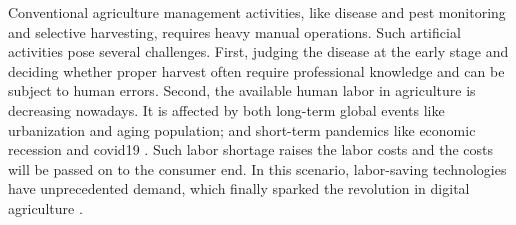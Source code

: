 Conventional agriculture management activities, like disease and pest monitoring and selective harvesting, requires heavy manual operations. Such artificial activities pose several challenges. First, judging the disease at the early stage and deciding whether proper harvest often require professional knowledge and can be subject to human errors. 
Second, the available human labor in agriculture is decreasing nowadays. It is affected by both long-term global events like urbanization and aging population; and short-term pandemics like economic recession and \gls{covid19} \citep{gallardo_adoption_2018,larue_labor_2020}. Such labor shortage raises the labor costs and the costs will be passed on to the consumer end. In this scenario, labor-saving technologies have unprecedented demand, which finally sparked the revolution in digital agriculture \citep{gallardo_adoption_2018}.














